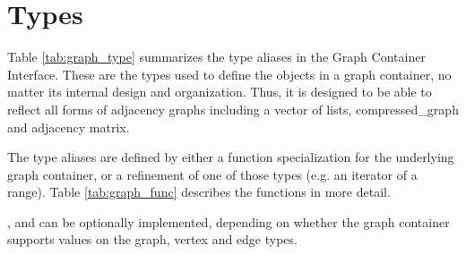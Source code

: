 \section{Types}
Table \ref{tab:graph_type} summarizes the type aliases in the Graph Container Interface. These are the types used to define the objects 
in a graph container, no matter its internal design and organization. Thus, it is designed to be able to reflect all forms of adjacency 
graphs including a vector of lists, compressed\_graph and adjacency matrix.

The type aliases are defined by either a function specialization for the underlying graph container, or a refinement of one of those types (e.g. an iterator of a range). Table \ref{tab:graph_func} describes the functions in more detail.

,  and  can be optionally implemented, depending on whether the graph container supports values on the graph, vertex and edge types.

